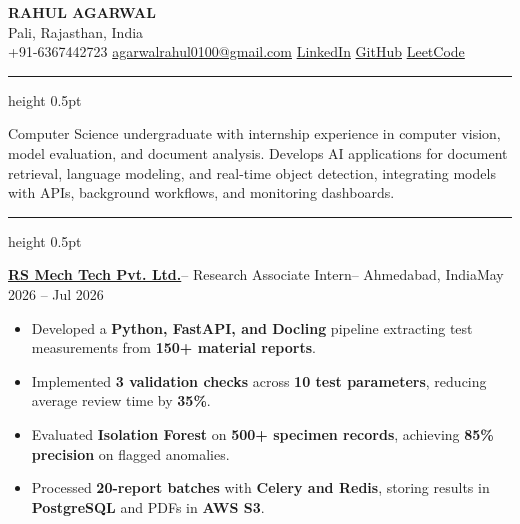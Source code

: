 \documentclass[a4paper,10pt]{extarticle}
\newcommand{\ressection}[1]{%
    \par\vspace{3pt}
    \noindent{\fontsize{10.4}{11.4}\selectfont
    \bfseries\MakeUppercase{#1}}\par
    \vspace{1pt}
    \hrule height 0.5pt
    \vspace{2pt}
}
\newcommand{\job}[4]{%
    \par\vspace{1pt}\noindent
    \textbf{#1}\enspace--\enspace
    #2\enspace--\enspace
    #3\hfill #4\par
}
\begin{document}
\begin{center}
    {\fontsize{22}{24}\selectfont\bfseries
    RAHUL AGARWAL}\\[4pt]

    {\fontsize{11}{13}\selectfont
    Pali, Rajasthan, India}\\[6pt]

    {\fontsize{10.5}{12.5}\selectfont
    \faPhone\enspace +91-6367442723
    \hspace{12pt}
    \faEnvelope\enspace
    \href{mailto:agarwalrahul0100@gmail.com}
    {agarwalrahul0100@gmail.com}
    \hspace{12pt}
    \faLinkedin\enspace
    \href{https://linkedin.com/in/rahul701}{LinkedIn}
    \hspace{12pt}
    \faGithub\enspace
    \href{https://github.com/RahulAgarwal701}{GitHub}
    \hspace{12pt}
    \faCode\enspace
    \href{https://leetcode.com/u/rahul6367/}{LeetCode}}
\end{center}
\vspace{-7pt}

\ressection{Summary}

Computer Science undergraduate with internship experience in computer vision,
model evaluation, and document analysis. Develops AI applications for document
retrieval, language modeling, and real-time object detection, integrating models
with APIs, background workflows, and monitoring dashboards.

\ressection{Work Experience}

\job{\href{https://www.rsmt.co.in/}{RS Mech Tech Pvt. Ltd.}}
{Research Associate Intern}
{Ahmedabad, India}
{May 2026 -- Jul 2026}

\begin{itemize}
    \item Developed a \textbf{Python, FastAPI, and Docling} pipeline
    extracting test measurements from \textbf{150+ material reports}.

    \item Implemented \textbf{3 validation checks} across
    \textbf{10 test parameters}, reducing average review time
    by \textbf{35\%}.

    \item Evaluated \textbf{Isolation Forest} on
    \textbf{500+ specimen records}, achieving
    \textbf{85\% precision} on flagged anomalies.

    \item Processed \textbf{20-report batches} with
    \textbf{Celery and Redis}, storing results in
    \textbf{PostgreSQL} and PDFs in \textbf{AWS S3}.
\end{itemize}
\end{document}
